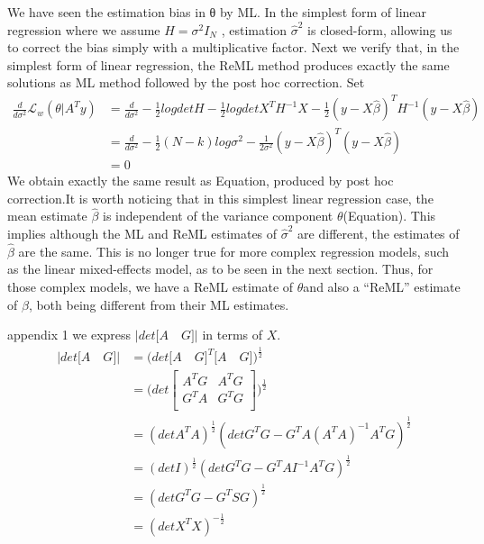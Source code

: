 \documentclass[a4paper,11pt]{article}
\begin{document}
We have seen the estimation bias in θ by ML. In the simplest form of linear regression where we assume $H = \sigma ^ 2 I_N$ , estimation $\widehat{\sigma} ^ 2$ is closed-form, allowing us to correct the bias simply with a multiplicative factor. Next we verify that, in the simplest form of linear regression, the ReML method produces exactly the same solutions as ML method followed by the post hoc correction.
Set
\begin{equation}\label{eq:5} 
  \begin{split}
          \frac{d}{d \sigma ^2} {\mathcal{L}}_w (\theta| A^T y) &= \frac{d}{d \sigma ^2} -\frac{1}{2} log det H-\frac{1}{2} log det X^T H^{-1} X -\frac{1}{2}(y - X\widehat{\beta})^T H^{-1} (y - X\widehat{\beta})\\
          &= \frac{d}{d \sigma ^2} -\frac{1}{2}(N-k) log \sigma ^2 -\frac{1}{2 \sigma ^2}(y - X\widehat{\beta})^T (y - X\widehat{\beta})\\
          &= 0
  \end{split}
\end{equation}
We obtain exactly the same result as Equation, produced by post hoc correction.It is worth noticing that in this simplest linear regression case, the mean estimate $\widehat{\beta}$ is independent of the variance component  $\theta$(Equation). This implies although the ML and ReML estimates of $\widehat{\sigma} ^ 2$ are different, the estimates of  $\widehat{\beta}$ are the same. This is no longer true for more complex regression models, such as the linear mixed-effects model, as to be seen in the next section. Thus, for those complex models, we have a ReML estimate of $\theta$and also a “ReML” estimate of $\beta$, both being different from their ML estimates.

appendix 1
we express $|det\bigg[A\quad G\bigg]|$ in terms of $X$.
\begin{equation}\label{eq:6} 
  \begin{split}
           |det\bigg[A\quad G\bigg]| &= \bigg(det \bigg[A\quad G\bigg]^T \bigg[A\quad G\bigg] \bigg)^\frac{1}{2}\\
         &= \bigg( det \left[\begin{array}{cc} A^T G & A^T G \\  G^T A & G^T G \\ \end{array}\right] \bigg)^\frac{1}{2}\\
          &= (det A^T A)^\frac{1}{2}(detG^TG - G^TA(A^TA)^{-1}A^TG)^\frac{1}{2}\\
          &= (detI)^\frac{1}{2}(detG^TG - G^TAI^{-1}A^TG)^\frac{1}{2}\\
          &= (detG^TG -G^TSG)^\frac{1}{2}\\
          &= (det X^TX)^ {-\frac{1}{2}}
  \end{split}
\end{equation}
\end{document}
